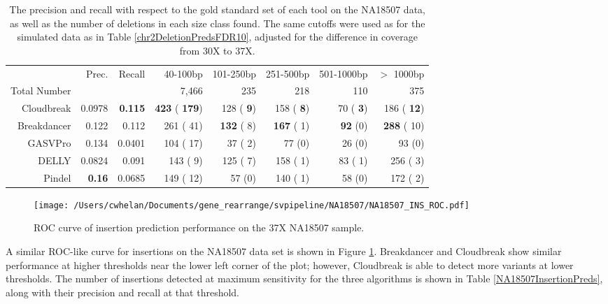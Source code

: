 \documentclass[11pt]{article}
\begin{document}
\begin{table}[t]
\begin{center}
\begin{tabular}{rrr|rrrrr}
  \hline
 & Prec. & Recall & 40-100bp & 101-250bp & 251-500bp & 501-1000bp & $>$ 1000bp \\ 
Total Number & & & 7,466 & 235 & 218 & 110 & 375 \\
  \hline
Cloudbreak & 0.0978 & \textbf{0.115} & \textbf{ 423} (\textbf{ 179})  &  128 (\textbf{   9}) &   158 (\textbf{   8}) &   70 (\textbf{   3}) &  186 (\textbf{  12}) \\ 
Breakdancer & 0.122 & 0.112 &  261 (  41)  & \textbf{ 132} (   8) &  \textbf{ 167} (   1) & \textbf{  92} (0) & \textbf{ 288} (  10) \\  
  GASVPro & 0.134 & 0.0401 &  104 (  17)  &   37 (   2) &    77 (0) &   26 (0) &   93 (0) \\ 
  DELLY & 0.0824 & 0.091 &  143 (   9)  &  125 (   7) &   158 (   1) &   83 (   1) &  256 (   3) \\ 
  Pindel & \textbf{0.16} & 0.0685 &  149 (  12)  &   57 (0) &   140 (   1) &   58 (0) &  172 (   2) \\ 
   \hline
\end{tabular}
\end{center}
\caption{The precision and recall with respect to the gold standard set of each tool on the NA18507 data, as well as the number of deletions in each size class found. The same cutoffs were used as for the simulated data as in Table \ref{chr2DeletionPredsFDR10}, adjusted for the difference in coverage from 30X to 37X.}
\label{NA18507DeletionPreds}
\end{table}

\begin{figure}[t]
\centering
\texttt{[image: /Users/cwhelan/Documents/gene\_rearrange/svpipeline/NA18507/NA18507\_INS\_ROC.pdf]}
\caption{ROC curve of insertion prediction performance on the 37X NA18507 sample.}
\label{NA18507InsertionsRoc}
\end{figure}

A similar ROC-like curve for insertions on the NA18507 data set is shown in Figure \ref{NA18507InsertionsRoc}. Breakdancer and Cloudbreak show similar performance at higher thresholds near the lower left corner of the plot; however, Cloudbreak is able to detect more variants at lower thresholds. The number of insertions detected at maximum sensitivity for the three algorithms is shown in Table \ref{NA18507InsertionPreds}, along with their precision and recall at that threshold.
\end{document}
